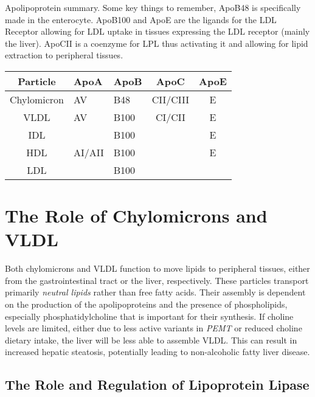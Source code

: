 \documentclass{tufte-handout}
\begin{document}
\begin{margintable}
\centering
\caption{Apolipoprotein summary.  Some key things to remember, ApoB48 is specifically made in the enterocyte.  ApoB100 and ApoE are the ligands for the LDL Receptor allowing for LDL uptake in tissues expressing the LDL receptor (mainly the liver).  ApoCII is a coenzyme for LPL thus activating it and allowing for lipid extraction to peripheral tissues.}
\label{tab:apolipoproteins}
\begin{tabular}{@{}cllcc@{}}
\toprule
\textbf{Particle} & \textbf{ApoA} & \textbf{ApoB} & \textbf{ApoC} & \textbf{ApoE} \\ \midrule
Chylomicron       &  AV         & B48           & CII/CIII           & E             \\
VLDL              &   AV            & B100          & CI/CII        & E             \\
IDL               &                  & B100         &        &   E \\
HDL               & AI/AII          & B100          &               &             E  \\
LDL               &         & B100          &               &              
\end{tabular}
\end{margintable}
\section{The Role of Chylomicrons and VLDL}

Both chylomicrons and VLDL function to move lipids to peripheral tissues, either from the gastrointestinal tract or the liver, respectively.  These particles transport primarily \emph{neutral lipids} rather than free fatty acids.  Their assembly is dependent on the production of the apolipoproteins and the presence of phospholipids, especially phosphatidylcholine that is important for their synthesis.   If choline levels are limited, either due to less active variants in \textit{PEMT} or reduced choline dietary intake, the liver will be less able to assemble VLDL.  This can result in increased hepatic steatosis, potentially leading to non-alcoholic fatty liver disease.

\subsection{The Role and Regulation of Lipoprotein Lipase}
\end{document}
